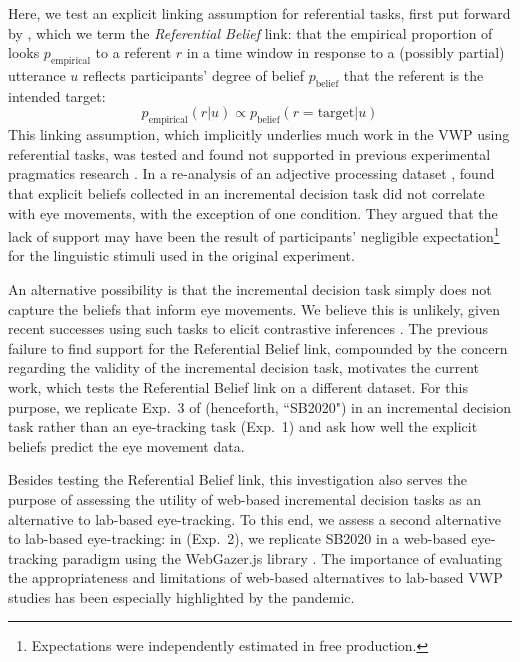 \documentclass[10pt,letterpaper]{article}
\newcommand{\expref}[1]{Exp.~#1}
\begin{document}
Here, we test an explicit linking assumption for referential tasks, first put forward by , which we term the \emph{Referential Belief} link: that the empirical proportion of looks $p_{\text{empirical}}$ to a referent $r$ in a time window in response to a (possibly partial) utterance $u$ reflects participants' degree of belief $p_{\text{belief}}$ that the referent is the intended target:
\begin{equation}
p_{\text{empirical}}(r|u) \propto p_{\text{belief}}(r = \text{target}|u)
\end{equation}
This linking assumption, which implicitly underlies much work in the VWP using referential tasks, was  tested and found not supported in previous experimental pragmatics research  \cite{QingLD2018}. In a re-analysis of an adjective processing dataset \cite{LeffelXiangKennedy2016:Imprecision-is-Pragmatic-},  found that explicit beliefs collected in an incremental decision task \cite<similar to gating tasks,>{Allopenna1998} did not correlate with eye movements, with the exception of one condition. They argued that the lack of support may have been the result of participants' negligible expectation\footnote{Expectations were independently estimated in free production.}  for  the  linguistic stimuli used in the original experiment.  


An alternative possibility is that the incremental decision task simply does not capture the beliefs that inform eye movements. We believe this is unlikely, given recent successes  using such tasks to elicit contrastive inferences \cite{KreissDegen2020, alsop2018}. The previous failure to find support for the Referential Belief link, compounded by the concern regarding the validity of the incremental decision task, motivates the current work, which tests the Referential Belief link on a different dataset. For this purpose, we replicate \expref{3} of  (henceforth, ``SB2020") in an incremental decision task rather than an eye-tracking task (\expref{1}) and ask how well the explicit beliefs predict the eye movement data. 


Besides testing the Referential Belief link, this investigation also serves the purpose of assessing the utility of web-based incremental decision tasks as an alternative to lab-based eye-tracking. To this end, we assess a second alternative to lab-based eye-tracking: in   (\expref{2}), we replicate SB2020 in a web-based eye-tracking paradigm using the WebGazer.js library \cite{papoutsaki2016webgazer}. The importance of evaluating the appropriateness and limitations of web-based alternatives to lab-based VWP studies has been especially highlighted by the pandemic.  
\end{document}
